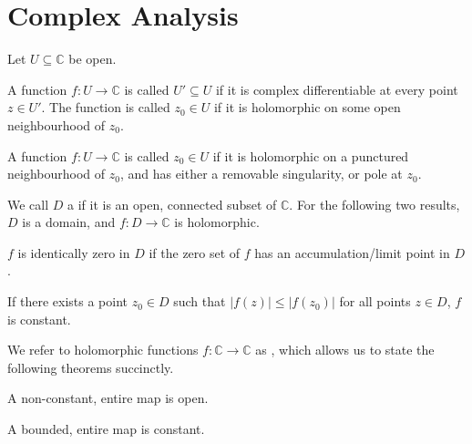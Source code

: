 \vspace{-0.8\baselineskip}
\section{Complex Analysis}
Let $ U \subseteq \mathbb{C} $ be open.

\begin{definition}[Holomorphicity]\label{def:holomorphicity}
	A function $ f:U \to \mathbb{C} $ is called  $ U'
		\subseteq U $ if it is complex differentiable at every point $ z \in U' $. The
	function is called  $ z_0 \in U $ if it is holomorphic
	on some open neighbourhood of $ z_0 $.
\end{definition}

\begin{definition}[Meromorphicity]
	A function $ f:U \to \mathbb{C} $ is called  $ z_0 \in U
	$ if it is holomorphic on a punctured neighbourhood of $ z_0 $, and has either a
	removable singularity, or pole at $ z_0 $.
\end{definition}

\vspace{-0.5\baselineskip}
We call $ D $ a  if it is an open, connected subset of $
	\mathbb{C} $. For the following two results, $ D $ is a domain, and $ f:D \to
	\mathbb{C} $ is holomorphic.

\begin{theorem}
	$ f $ is identically zero in $ D $ if the zero set of $ f $ has an
	accumulation/limit point in $ D $.
\end{theorem}

\begin{theorem}\label{thm:pre-max-mod}
	If there exists a point $ z_0 \in D $ such that $ |f(z)|\leq|f(z_0)| $ for all
	points $ z \in D $, $ f $ is constant.
\end{theorem}

\vspace{-0.5\baselineskip}
We refer to holomorphic functions $ f:\mathbb{C} \to \mathbb{C} $ as
, which allows us to state the following theorems succinctly.

\begin{theorem}
	A non-constant, entire map is open.
\end{theorem}

\begin{theorem}
	A bounded, entire map is constant.
\end{theorem}
